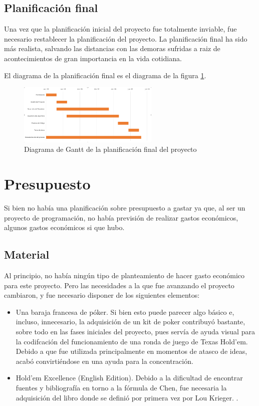 \subsection{Planificación final}

Una vez que la planificación inicial del proyecto fue totalmente inviable, fue necesario restablecer la planificación del proyecto. La planificación final ha sido más realista, salvando las distancias con las demoras sufridas a raiz de acontecimientos de gran importancia en la vida cotidiana.

El diagrama de la planificación final es el diagrama de la figura \ref{fig:gant2}.

\begin{figure}[tb]
\centering
\includegraphics[width=0.6\textwidth]{figuras/gant2.png}   
\caption{Diagrama de Gantt de la planificación final del proyecto}
\label{fig:gant2}
\end{figure}

\section{Presupuesto}

Si bien no había una planificación sobre presupuesto a gastar ya que, al ser un proyecto de programación, no había previsión de realizar gastos económicos, algunos gastos económicos si que hubo.

\subsection{Material}
Al principio, no había ningún tipo de planteamiento de hacer gasto económico para este proyecto. Pero las necesidades a la que fue avanzando el proyecto cambiaron, y fue necesario disponer de los siguientes elementos:
\begin{itemize}
\item Una baraja francesa de póker. Si bien esto puede parecer algo básico e, incluso, innecesario, la adquisición de un kit de poker contribuyó bastante, sobre todo en las fases iniciales del proyecto, pues servía de ayuda visual para la codifcación del funcionamiento de una ronda de juego de Texas Hold'em. Debido a que fue utilizada principalmente en momentos de atasco de ideas, acabó convirtiéndose en una ayuda para la concentración.
\item Hold'em Excellence (English Edition). Debido a la dificultad de encontrar fuentes y bibliografía en torno a la fórmula de Chen, fue necesaria la adquisición del libro donde se definió por primera vez por Lou Krieger. \cite{krieger}.
\end{itemize}

